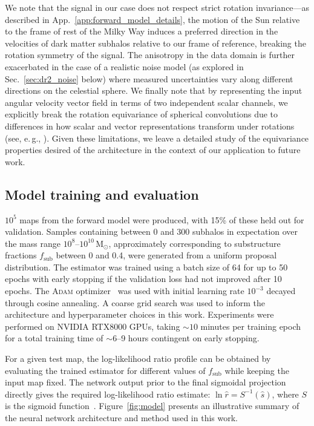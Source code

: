 \documentclass[twocolumn]{aastex631}
\newcommand{\eg}{{e.\,g.}\xspace}
\begin{document}
{We note that the signal in our case does not respect strict rotation invariance---as described in App.~\ref{app:forward_model_details}, the motion of the Sun relative to the frame of rest of the Milky Way induces a preferred direction in the velocities of dark matter subhalos relative to our frame of reference, breaking the rotation symmetry of the signal. The anisotropy in the data domain is further exacerbated in the case of a realistic noise model (as explored in Sec.~\ref{sec:dr2_noise} below) where measured uncertainties vary along different directions on the celestial sphere. We finally note that by representing the input angular velocity vector field in terms of two independent scalar channels, we explicitly break the rotation equivariance of spherical convolutions due to differences in how scalar and vector representations transform under rotations (see, \eg, \citet{DBLP:conf/nips/EstevesMD20}). Given these limitations, we leave a detailed study of the equivariance properties desired of the architecture in the context of our application to future work.}

\subsection{Model training and evaluation} 

$10^5$ maps from the forward model were produced, with 15\% of these held out for validation. {Samples containing between 0 and 300 subhalos in expectation over the mass range $10^{8}$--$10^{10}\,\mathrm{M}_\odot$, approximately corresponding to substructure fractions $f_\mathrm{sub}$ between 0 and 0.4, were generated from a uniform proposal distribution.} The estimator was trained using a batch size of 64 for up to 50 epochs with early stopping if the validation loss had not improved after 10 epochs. The \textsc{Adam} optimizer~\citep{kingma2017adam} was used with initial learning rate $10^{-3}$ decayed through cosine annealing. A coarse grid search was used to inform the architecture and hyperparameter choices in this work. {Experiments were performed on NVIDIA RTX8000 GPUs, taking $\sim10$ minutes per training epoch for a total training time of $\sim6$--9 hours contingent on early stopping.}

For a given test map, the log-likelihood ratio profile can be obtained by evaluating the trained estimator for different values of $f_\mathrm{sub}$ while keeping the input map fixed. The network output prior to the final sigmoidal projection directly gives the required log-likelihood ratio estimate: $\ln\hat r = S^{-1}(\hat s)$, where $S$ is the sigmoid function~\citep{Hermans:2019ioj,Hermans:2020skz}.
Figure~\ref{fig:model} presents an illustrative summary of the neural network architecture and method used in this work. \vspace{0.5cm}
\end{document}
